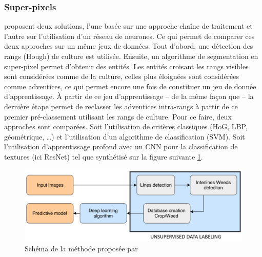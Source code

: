\documentclass[../thesis.tex]{subfiles}
\begin{document}
    \subsubsection{Super-pixels} %
    \cite{rs10111690} proposent deux solutions, l'une basée sur une approche chaîne de traitement et l'autre sur l'utilisation d'un réseau de neurones. Ce qui permet de comparer ces deux approches sur un même jeux de données. Tout d'abord, une détection des rangs (Hough) de culture est utilisée. Ensuite, un algorithme de segmentation en super-pixel permet d'obtenir des entités. Les entités croisant les rangs visibles sont considérées comme de la culture, celles plus éloignées sont considérées comme adventices, ce qui permet encore une fois de constituer un jeu de donnée d'apprentissage.
    À partir de ce jeu d'apprentissage -- de la même façon que \cite{rs10050761} -- la dernière étape permet de reclasser les adventices intra-rangs à partir de ce premier pré-classement utilisant les rangs de culture. Pour ce faire, deux approches sont comparées. Soit l'utilisation de critères classiques (HoG, LBP, géométrique, \dots) et l'utilisation d'un algorithme de classification (SVM). Soit l'utilisation d'apprentissage profond avec un CNN pour la classification de textures (ici ResNet) tel que synthétisé sur la figure suivante \ref{fig:difference-bah}.
    
    \begin{figure}[H]
        \centering
        \includegraphics[width=0.8\linewidth]{img/biblio/difference-bah}
        \caption{Schéma de la méthode proposée par \cite{rs10111690}}
        \label{fig:difference-bah}
    \end{figure}
    
\end{document}
